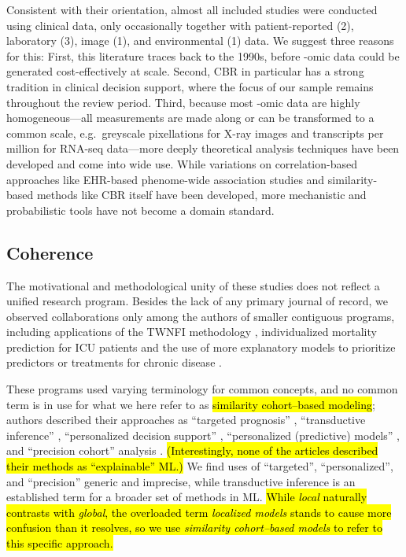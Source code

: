 \documentclass[sn-mathphys,Numbered,pdflatex]{sn-jnl}
\theoremstyle{remark}
\theoremstyle{definition}
\begin{document}
Consistent with their orientation, almost all included studies were
conducted using clinical data, only occasionally together with
patient-reported (2), laboratory (3), image (1), and environmental (1)
data. We suggest three reasons for this: First, this literature traces
back to the 1990s, before -omic data could be generated cost-effectively
at scale. Second, CBR in particular has a strong tradition in clinical
decision support, where the focus of our sample remains throughout the
review period. Third, because most -omic data are highly
homogeneous---all measurements are made along or can be transformed to a
common scale, e.g.~greyscale pixellations for X-ray images and
transcripts per million for RNA-seq data---more deeply theoretical
analysis techniques have been developed and come into wide use. While
variations on correlation-based approaches like EHR-based phenome-wide
association studies and similarity-based methods like CBR itself have
been developed, more mechanistic and probabilistic tools have not become
a domain standard.

\subsection{Coherence}\label{coherence}

The motivational and methodological unity of these studies does not
reflect a unified research program. Besides the lack of any primary
journal of record, we observed collaborations only among the authors of
smaller contiguous programs, including applications of the TWNFI
methodology \citep{Song2006, Verma2015}, individualized mortality
prediction for ICU patients \citep{Lee2015, Lee2017} and the use of more
explanatory models to prioritize predictors or treatments for chronic
disease \citep{Ng2015, Tang2021, Ng2021}.

These programs used varying terminology for common concepts, and no
common term is in use for what we here refer to as
\hl{similarity cohort--based modeling}; authors described their
approaches as ``targeted prognosis'' \citep{Mariuzzi1997},
``transductive inference'' \citep{Song2006}, ``personalized decision
support'' \citep{Lee2015}, ``personalized (predictive) models''
\citetext{\citealp[in contrast to ``local
models'']{Liang2015}; \citealp{Ng2015}; \citealp{Wang2019}; \citealp{Ma2020}; \citealp{Liu2022}; \citealp{Doborjeh2022}},
and ``precision cohort'' analysis \citep{Wang2019, Tang2021, Ng2021}.
\hl{(Interestingly, none of the articles described their methods as ``explainable'' ML.)}
We find uses of ``targeted'', ``personalized'', and ``precision''
generic and imprecise, while transductive inference is an established
term for a broader set of methods in ML.
\hl{While \emph{local} naturally contrasts with \emph{global}, the overloaded term \emph{localized models} stands to cause more confusion than it resolves, so we use \emph{similarity cohort--based models} to refer to this specific approach.}
\end{document}
